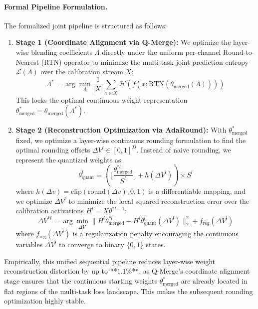\paragraph{Formal Pipeline Formulation.}
The formalized joint pipeline is structured as follows:
\begin{enumerate}
    \item \textbf{Stage 1 (Coordinate Alignment via Q-Merge):} We optimize the layer-wise blending coefficients $\Lambda$ directly under the uniform per-channel Round-to-Nearest (RTN) operator to minimize the multi-task joint prediction entropy $\mathcal{L}(\Lambda)$ over the calibration stream $X$:
    \begin{equation}
        \Lambda^* = \arg\min_{\Lambda} \frac{1}{|X|} \sum_{x \in X} \mathcal{H}\left(f\left(x; \text{RTN}(\theta_{\text{merged}}(\Lambda))\right)\right)
    \end{equation}
    This locks the optimal continuous weight representation $\theta^*_{\text{merged}} = \theta_{\text{merged}}(\Lambda^*)$.
    
    \item \textbf{Stage 2 (Reconstruction Optimization via AdaRound):} With $\theta^*_{\text{merged}}$ fixed, we optimize a layer-wise continuous rounding formulation to find the optimal rounding offsets $\Delta V^l \in [0, 1]^D$. Instead of naive rounding, we represent the quantized weights as:
    \begin{equation}
        \theta^l_{\text{quant}} = \left( \lfloor \frac{\theta^{*l}_{\text{merged}}}{S^l} \rfloor + h(\Delta V^l) \right) \times S^l
    \end{equation}
    where $h(\Delta v) = \text{clip}(\text{round}(\Delta v), 0, 1)$ is a differentiable mapping, and we optimize $\Delta V^l$ to minimize the local squared reconstruction error over the calibration activations $H^l = X \theta^{*l-1}$:
    \begin{equation}
        \Delta V^{*l} = \arg\min_{\Delta V^l} \| H^l \theta^{*l}_{\text{merged}} - H^l \theta^l_{\text{quant}}(\Delta V^l) \|_2^2 + f_{\text{reg}}(\Delta V^l)
    \end{equation}
    where $f_{\text{reg}}(\Delta V^l)$ is a regularization penalty encouraging the continuous variables $\Delta V^l$ to converge to binary $\{0, 1\}$ states.
\end{enumerate}

Empirically, this unified sequential pipeline reduces layer-wise weight reconstruction distortion by up to **$1.1\%$**, as Q-Merge's coordinate alignment stage ensures that the continuous starting weights $\theta^*_{\text{merged}}$ are already located in flat regions of the multi-task loss landscape. This makes the subsequent rounding optimization highly stable.

